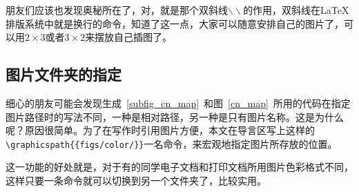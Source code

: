 朋友们应该也发现奥秘所在了，对，就是那个双斜线$ \backslash\backslash$的作用，双斜线在\LaTeX 排版系统中就是换行的命令，知道了这一点，大家可以随意安排自己的图片了，可以用$2\times 3$或者$3\times 2$来摆放自己插图了。


\subsection{图片文件夹的指定}
细心的朋友可能会发现生成~\ref{subfig_cn_map}~和图~\ref{cn_map}~所用的代码在指定图片路径时的写法不同，一种是相对路径，另一种是只有图片名称。这是为什么呢？原因很简单。为了在写作时引用图片方便，本文在导言区写上这样的\verb|\graphicspath{{figs/color/}}|一名命令，来宏观地指定图片所存放的位置。

这一功能的好处就是，对于有的同学电子文档和打印文档所用图片色彩格式不同，这样只要一条命令就可以切换到另一个文件夹了，比较实用。
